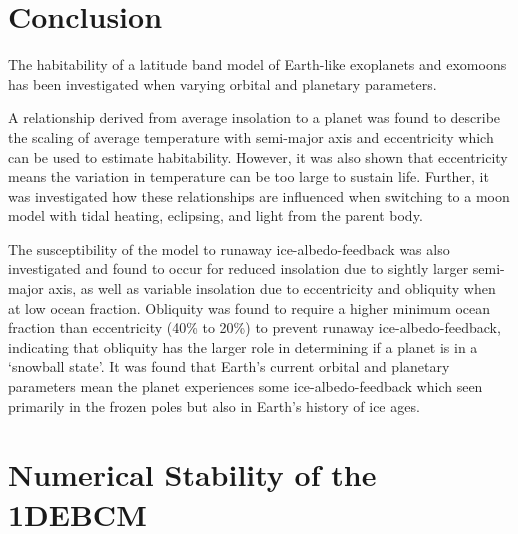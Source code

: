 \documentclass[12pt, onecolumn]{revtex4-2}    %
\begin{document}

\section{Conclusion} \label{sec:Conclusion}
The habitability of a latitude band model of Earth-like exoplanets and exomoons has been investigated when varying orbital and planetary parameters.

A relationship derived from average insolation to a planet was found to describe the scaling of average temperature with semi-major axis and eccentricity which can be used to estimate habitability.
However, it was also shown that eccentricity means the variation in temperature can be too large to sustain life.
Further, it was investigated how these relationships are influenced when switching to a moon model with tidal heating, eclipsing, and light from the parent body.

The susceptibility of the model to runaway ice-albedo-feedback was also investigated and found to occur for reduced insolation due to sightly larger semi-major axis, as well as variable insolation due to eccentricity and obliquity when at low ocean fraction.
Obliquity was found to require a higher minimum ocean fraction than eccentricity (40\% to 20\%) to prevent runaway ice-albedo-feedback, indicating that obliquity has the larger role in determining if a planet is in a `snowball state'.
It was found that Earth's current orbital and planetary parameters mean the planet experiences some ice-albedo-feedback which seen primarily in the frozen poles but also in Earth's history of ice ages.




\clearpage

\appendix

\section{Numerical Stability of the 1DEBCM} \label{appx:NumStability}
\end{document}
